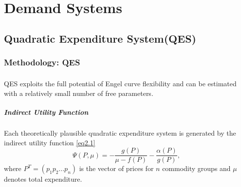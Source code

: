 \chapter{Demand Systems}\label{chp:Demand_Systems}







\section{Quadratic Expenditure System(QES)}
\subsection{Methodology: QES}
\paragraph{}{QES exploits the full potential of Engel curve flexibility and can be estimated with a relatively small number of free parameters. }

\paragraph{Indirect Utility Function}{Each theoretically plausible quadratic expenditure system is generated by the indirect utility function \cref{eq2.1}
	\begin{equation}\label{eq2.1}
		\Psi(P,\mu) = -\frac{g(P)}{\mu - f(P)} - \frac{\alpha (P)}{g(P)},
	\end{equation}
where $P^T=(p_1 p_2 ... p_n)$ is the vector of prices for $n$ commodity groups and $\mu$ denotes total expenditure. 
}

